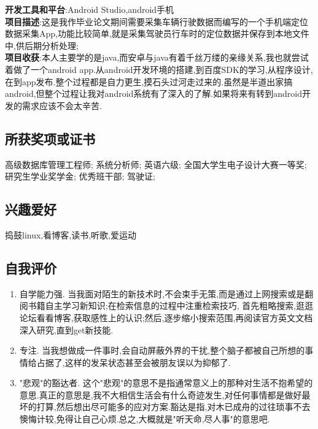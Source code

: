 \documentclass[11pt]{ctexart}
\begin{document}
\textbf{开发工具和平台}:Android Studio,android手机\\
\textbf{项目描述}:这是我作毕业论文期间需要采集车辆行驶数据而编写的一个手机端定位数据采集App,功能比较简单,就是采集驾驶员行车时的定位数据并保存到本地文件中,供后期分析处理;\\
\textbf{项目收获}:本人主要学的是java,而安卓与java有着千丝万缕的亲缘关系,我也就尝试着做了一个android app.从android开发环境的搭建,到百度SDK的学习,从程序设计,在到app发布.整个过程都是自力更生,摸石头过河走过来的.虽然是半道出家搞android,但整个过程让我对android系统有了深入的了解.如果将来有转到android开发的需求应该不会太辛苦.\\
\subsection{所获奖项或证书}
\label{sec-1-7}

高级数据库管理工程师;
系统分析师;
英语六级;
全国大学生电子设计大赛一等奖;
研究生学业奖学金;
优秀班干部;
驾驶证;
\subsection{兴趣爱好}
\label{sec-1-8}
捣鼓linux,看博客,读书,听歌,爱运动
\subsection{自我评价}
\label{sec-1-9}
\begin{enumerate}
\item 自学能力强. 当我面对陌生的新技术时,不会束手无策,而是通过上网搜索或是翻阅书籍自主学习新知识;在检索信息的过程中注重检索技巧, 首先粗略搜索,逛逛论坛看看博客,获取感性上的认识;然后,逐步缩小搜索范围,再阅读官方英文文档深入研究,直到get新技能.\\
\item 专注. 当我想做成一件事时,会自动屏蔽外界的干扰,整个脑子都被自己所想的事情给占据了,这样的发呆状态甚至会被朋友误以为抑郁了.\\
\item "悲观"的豁达者. 这个"悲观"的意思不是指通常意义上的那种对生活不抱希望的意思.真正的意思是,我不大相信生活会有什么奇迹发生,对任何事情都是做好最坏的打算,然后想出尽可能多的应对方案.豁达是指,对木已成舟的过往琐事不去懊悔计较,免得让自己心烦.总之,大概就是"听天命,尽人事"的意思吧.
\end{enumerate}
\end{document}
